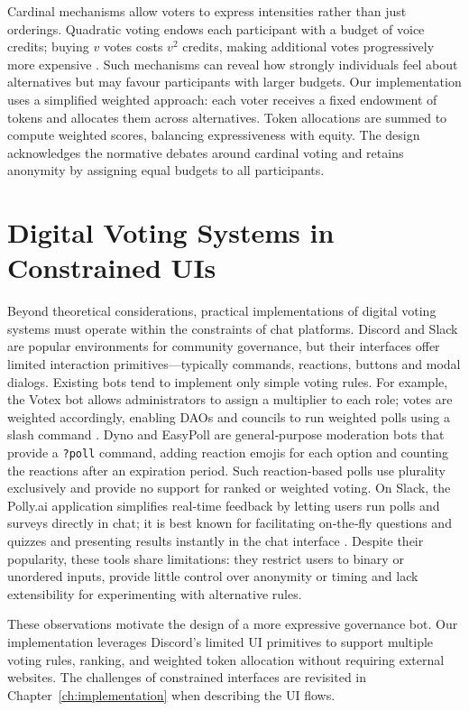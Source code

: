 Cardinal mechanisms allow voters to express intensities rather than
just orderings.  Quadratic voting endows each participant with a budget
of voice credits; buying $v$ votes costs $v^2$ credits, making
additional votes progressively more expensive \cite{Bartholdi1989}.
Such mechanisms can reveal how strongly individuals feel about
alternatives but may favour participants with larger budgets.  Our
implementation uses a simplified weighted approach: each voter receives
a fixed endowment of tokens and allocates them across alternatives.
Token allocations are summed to compute weighted scores, balancing
expressiveness with equity.  The design acknowledges the normative
debates around cardinal voting and retains anonymity by assigning
equal budgets to all participants.

\section{Digital Voting Systems in Constrained UIs}

Beyond theoretical considerations, practical implementations of digital
voting systems must operate within the constraints of chat platforms.
Discord and Slack are popular environments for community governance, but
their interfaces offer limited interaction primitives—typically
commands, reactions, buttons and modal dialogs.  Existing bots tend
to implement only simple voting rules.  For example, the Votex bot
allows administrators to assign a multiplier to each role; votes are
weighted accordingly, enabling DAOs and councils to run weighted polls
using a slash command \cite{ZikenLabs2024}.  Dyno and EasyPoll are
general‑purpose moderation bots that provide a \texttt{?poll} command,
adding reaction emojis for each option and counting the reactions after
an expiration period.  Such reaction‑based polls use plurality
exclusively and provide no support for ranked or weighted voting.  On
Slack, the Polly.ai application simplifies real‑time feedback by letting users run
polls and surveys directly in chat; it is best known for facilitating
on‑the‑fly questions and quizzes and presenting results instantly in the
chat interface \cite{ZapierSlackPoll2023}.  Despite their popularity,
these tools share limitations: they restrict users to binary or
unordered inputs, provide little control over anonymity or timing and
lack extensibility for experimenting with alternative rules.

These observations motivate the design of a more expressive governance
bot.  Our implementation leverages Discord’s limited UI primitives to
support multiple voting rules, ranking, and weighted token allocation
without requiring external websites.  The challenges of constrained
interfaces are revisited in Chapter~\ref{ch:implementation} when
describing the UI flows.

